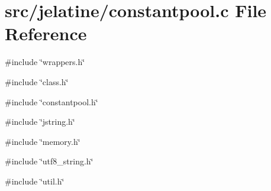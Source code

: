 \section{src/jelatine/constantpool.c File Reference}
\label{constantpool_8c}
{\ttfamily \#include \char`\"{}wrappers.h\char`\"{}}\par
{\ttfamily \#include \char`\"{}class.h\char`\"{}}\par
{\ttfamily \#include \char`\"{}constantpool.h\char`\"{}}\par
{\ttfamily \#include \char`\"{}jstring.h\char`\"{}}\par
{\ttfamily \#include \char`\"{}memory.h\char`\"{}}\par
{\ttfamily \#include \char`\"{}utf8\_\-string.h\char`\"{}}\par
{\ttfamily \#include \char`\"{}util.h\char`\"{}}\par
